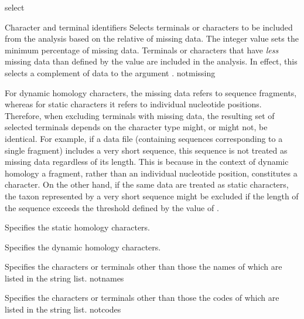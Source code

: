 \begin{command}{select}{}
\begin{arguments}
\begin{argumentgroup}{Character and terminal identifiers}
                {Selects terminals or characters to be included from the analysis
                based on the relative of missing data. The
                integer value sets the minimum percentage of missing
                data. Terminals or characters that have  \emph{less} missing data
                than defined by the value are included in the analysis.
                In effect, this selects a complement of data to the argument .}
                {notmissing}

                \begin{statement}
                For dynamic homology characters, the missing data refers to
                sequence fragments, whereas for static characters it refers to
                individual nucleotide positions. Therefore, when excluding
                terminals with missing data, the resulting set of selected
                terminals depends on the character type might, or
                might not, be identical. For example, if a data file (containing
                sequences corresponding to a single fragment) includes
                a very short sequence, this sequence is not treated as
                missing data regardless of its length. This is because in the
                context of dynamic homology a fragment, rather than an
                individual nucleotide position, constitutes a character.
                On the other hand, if the same data are treated as static characters,
                the taxon represented by a very short sequence
                might be excluded if the length of the sequence exceeds the
                threshold defined by the value of .
                \end{statement}

                {Specifies the static homology characters.}
                {}

                {Specifies the dynamic homology characters.}
                {}

                {Specifies the characters or terminals other than those the
                names of which are listed in the string list.}
                {notnames}

                {Specifies the characters or terminals other than those the
                codes of which are listed in the string list.}
                {notcodes}


\end{argumentgroup}
\end{arguments}
\end{command}
